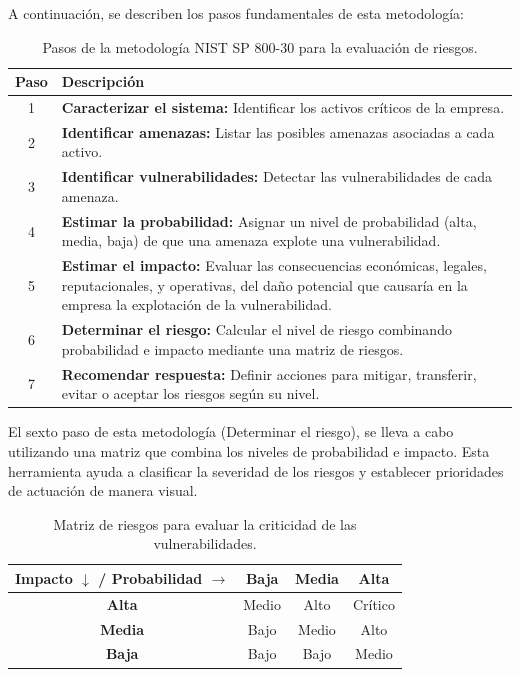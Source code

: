 \documentclass[a4paper, 11pt]{article}
\begin{document}
\vspace{0.3cm}

A continuación, se describen los pasos fundamentales de esta metodología:
\vspace{0.3cm}


\begin{table}[H]
\centering
\begin{tabular}{|c|p{12cm}|}
\hline
\rowcolor[HTML]{EFEFEF}
\textbf{Paso} & \textbf{Descripción} \\
\hline
1 & \textbf{Caracterizar el sistema:} Identificar los activos críticos de la empresa. \\
\hline
2 & \textbf{Identificar amenazas:} Listar las posibles amenazas asociadas a cada activo. \\
\hline
3 & \textbf{Identificar vulnerabilidades:} Detectar las vulnerabilidades de cada amenaza. \\
\hline
4 & \textbf{Estimar la probabilidad:} Asignar un nivel de probabilidad (alta, media, baja) de que una amenaza explote una vulnerabilidad. \\
\hline
5 & \textbf{Estimar el impacto:} Evaluar las consecuencias económicas, legales, reputacionales, y operativas, del daño potencial que causaría en la empresa la explotación de la vulnerabilidad. \\
\hline
6 & \textbf{Determinar el riesgo:} Calcular el nivel de riesgo combinando probabilidad e impacto mediante una matriz de riesgos. \\
\hline
7 & \textbf{Recomendar respuesta:} Definir acciones para mitigar, transferir, evitar o aceptar los riesgos según su nivel. \\
\hline
\end{tabular}
\caption{Pasos de la metodología NIST SP 800-30 para la evaluación de riesgos.}
\end{table}

\vspace{0.3cm}

El sexto paso de esta metodología (Determinar el riesgo), se lleva a cabo utilizando una matriz que combina los niveles de probabilidad e impacto. Esta herramienta ayuda a clasificar la severidad de los riesgos y establecer prioridades de actuación de manera visual.
\vspace{0.3cm}


\begin{table}[H]
\centering\begin{tabular}{|c|c|c|c|}
\hline
\rowcolor[HTML]{D9EAD3}
\textbf{Impacto} $\downarrow$ / \textbf{Probabilidad} $\rightarrow$ & \textbf{Baja} & \textbf{Media} & \textbf{Alta} \\
\hline
\textbf{Alta}   & Medio          & Alto           & Crítico \\
\hline
\textbf{Media}  & Bajo           & Medio          & Alto \\
\hline
\textbf{Baja}   & Bajo           & Bajo           & Medio \\
\hline
\end{tabular}
\caption{Matriz de riesgos para evaluar la criticidad de las vulnerabilidades.}
\end{table}
\end{document}
